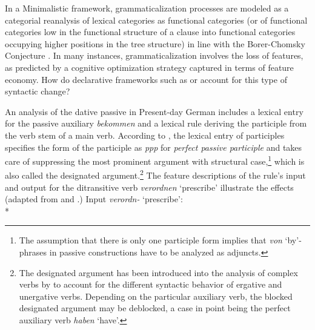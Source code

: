 \documentclass[output=paper
                ,modfonts
                ,nonflat
	        ,collection
	        ,collectionchapter
	        ,collectiontoclongg
 	        ,biblatex
                ,babelshorthands
                ,newtxmath
                ,draftmode
                ,colorlinks, citecolor=brown
]{./langsci/langscibook}
\begin{document}
In a Minimalistic framework, grammaticalization processes are modeled as a categorial reanalysis of lexical categories as functional categories (or of functional categories low in the functional structure of a clause into functional categories occupying higher positions in the tree structure) in line with the Borer-Chomsky Conjecture \citep[17]{RobRou2003}. In many instances, grammaticalization involves the loss of features, as predicted by a cognitive optimization strategy captured in terms of feature economy. How do declarative frameworks such as \lfg or \hpsg account for this type of syntactic change? 

An \hpsg analysis of the dative passive in Present-day German includes a lexical entry for the passive auxiliary \textit{bekommen} and a lexical rule deriving the participle from the verb stem of a main verb. According to \cite[288]{mueller2018}, the lexical entry of participles specifies the form of the participle as \textit{ppp} for \textit{perfect passive participle} and takes care of suppressing the most prominent argument with structural case,\footnote{The assumption that there is only one participle form implies that \textit{von} `by'-phrases in passive constructions have to be analyzed as adjuncts.} which is also called the designated argument.\footnote{The designated argument has been introduced into the analysis of complex verbs by \cite{haider1986} to account for the different syntactic behavior of ergative and unergative verbs. Depending on the particular auxiliary verb, the blocked designated argument may be deblocked, a case in point being the perfect auxiliary verb \textit{haben} `have'.} The feature descriptions of the rule's input and output for the ditransitive verb \textit{verordnen} `prescribe' illustrate the effects (adapted from \cite[149]{mueller2002} and \cite[285]{mueller2018}.)
\ea 
\label{verordnen-active}
Input \textit{verordn-} `prescribe': \\*
\z 
\end{document}
